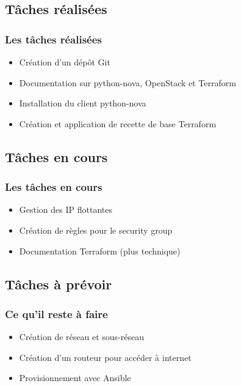 \documentclass[11pt]{beamer} %
\begin{document}
	
		
		\subsection{Tâches réalisées}
			\begin{frame}
				\frametitle{Les tâches réalisées}
				\begin{itemize}
					\item Création d'un dépôt Git
					\item Documentation sur python-nova, OpenStack et Terraform
					\item Installation du client python-nova
					\item Création et application de recette de base Terraform
				\end{itemize}
			\end{frame}
		
		
		\subsection{Tâches en cours}
			\begin{frame}
				\frametitle{Les tâches en cours}
				\begin{itemize}
					\item Gestion des IP flottantes
					\item Création de règles pour le security group
					\item Documentation Terraform (plus technique)
				\end{itemize}
			\end{frame}
		
			
		
		\subsection{Tâches à prévoir}
			\begin{frame}
				\frametitle{Ce qu'il reste à faire}
				\begin{itemize}
					\item Création de réseau et sous-réseau
					\item Création d'un routeur pour accéder à internet
					\item Provisionnement avec Ansible
				\end{itemize}
			\end{frame}
			
\end{document}
